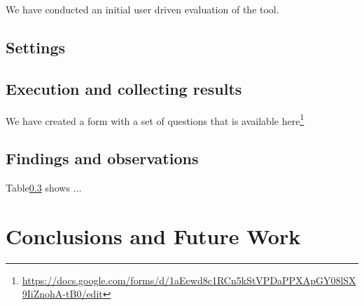 We have conducted an initial user driven evaluation of the tool.


\subsection{Settings}

\subsection{Execution and collecting results}
We have created a form with a set of questions that is available here\footnote{\url{https://docs.google.com/forms/d/1aEewd8c1RCn5kStVPDaPPXApGY08lSX9IiZnohA-tB0/edit}}


\subsection{Findings and observations}
Table\ref{} shows ...



\section{Conclusions and Future Work}\label{sec:conclusions}